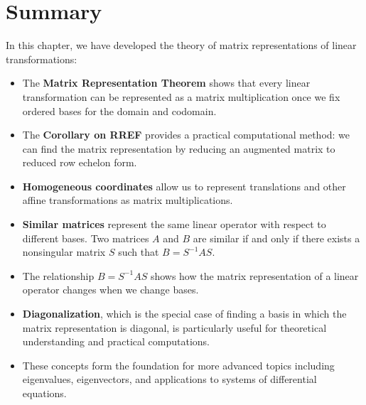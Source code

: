 \documentclass[12pt,a4paper]{article}
\begin{document}
	\newpage
	
	\section{Summary}
	
	In this chapter, we have developed the theory of matrix representations of linear transformations:
	
	\begin{itemize}
		\item The \textbf{Matrix Representation Theorem} shows that every linear transformation can be represented as a matrix multiplication once we fix ordered bases for the domain and codomain.
		
		\item The \textbf{Corollary on RREF} provides a practical computational method: we can find the matrix representation by reducing an augmented matrix to reduced row echelon form.
		
		\item \textbf{Homogeneous coordinates} allow us to represent translations and other affine transformations as matrix multiplications.
		
		\item \textbf{Similar matrices} represent the same linear operator with respect to different bases. Two matrices $A$ and $B$ are similar if and only if there exists a nonsingular matrix $S$ such that $B = S^{-1}AS$.
		
		\item The relationship $B = S^{-1}AS$ shows how the matrix representation of a linear operator changes when we change bases.
		
		\item \textbf{Diagonalization}, which is the special case of finding a basis in which the matrix representation is diagonal, is particularly useful for theoretical understanding and practical computations.
		
		\item These concepts form the foundation for more advanced topics including eigenvalues, eigenvectors, and applications to systems of differential equations.
	\end{itemize}
	
\end{document}
